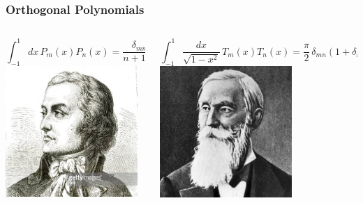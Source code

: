 \begin{frame}
  \frametitle{Orthogonal Polynomials\\
    }
  \begin{columns}
    \begin{column}{0.5\textwidth}
      \centering
      \begin{equation*}
        \int_{-1}^{1} dx \, P_m(x) P_n(x) = \frac{\delta_{mn}}{n+1/2}
      \end{equation*}
      \includegraphics[width=5cm]{figures/legendre.jpg}
    \end{column}
    \begin{column}{0.5\textwidth}
      \centering
      \begin{equation*}
        \int_{-1}^{1} \frac{dx}{\sqrt{1-x^2}} \, T_m(x) T_n(x) = \frac{\pi}{2} \, \delta_{mn} (1+\delta_{n0})
      \end{equation*}
      \includegraphics[width=5cm]{figures/chebyshev.jpg}
    \end{column}
  \end{columns}
 \end{frame}
